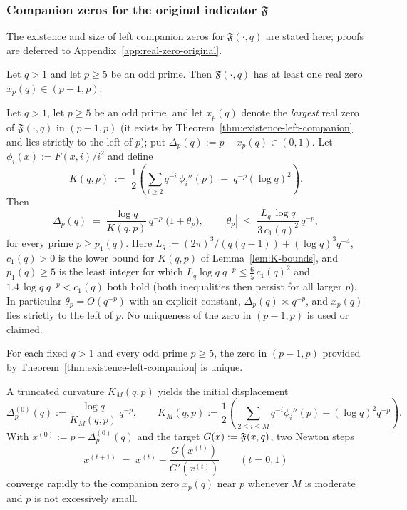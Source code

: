 \subsubsection{Companion zeros for the original indicator $\mathfrak F$}\label{sec:companions-F}
The existence and size of left companion zeros for $\mathfrak F(\cdot,q)$ are stated here; proofs are deferred to Appendix~\ref{app:real-zero-original}.

\begin{theorem}\label{thm:existence-left-companion}
Let $q>1$ and let $p\ge5$ be an odd prime. Then $\mathfrak F(\cdot,q)$ has at least one real zero $x_p(q)\in(p-1,p)$.
\end{theorem}

\begin{proposition}\label{prop:disp-asymp}
Let $q>1$, let $p\ge5$ be an odd prime, and let $x_p(q)$ denote the \emph{largest} real zero of $\mathfrak F(\cdot,q)$ in $(p-1,p)$ (it exists by Theorem~\ref{thm:existence-left-companion} and lies strictly to the left of $p$); put $\Delta_p(q):=p-x_p(q)\in(0,1)$. Let $\phi_i(x):=F(x,i)/i^2$ and define
\[
K(q,p)\;:=\;\frac{1}{2}\left(\sum_{i\ge2} q^{-i}\,\phi_i''(p)\;-\;q^{-p}(\log q)^2\right).
\]
Then
\[
\Delta_p(q)\;=\;\frac{\log q}{K(q,p)}\,q^{-p}\;\bigl(1+\theta_p\bigr),
\qquad
|\theta_p|\;\le\;\frac{L_q\,\log q}{3\,c_1(q)^2}\,q^{-p},
\]
for every prime $p\ge p_1(q)$. Here $L_q:=(2\pi)^3/(q(q-1))+(\log q)^3q^{-4}$, $c_1(q)>0$ is the lower bound for $K(q,p)$ of Lemma~\ref{lem:K-bounds}, and $p_1(q)\ge5$ is the least integer for which $L_q\log q\;q^{-p}\le\tfrac65\,c_1(q)^2$ and $1.4\,\log q\;q^{-p}<c_1(q)$ both hold (both inequalities then persist for all larger $p$). In particular $\theta_p=O(q^{-p})$ with an explicit constant, $\Delta_p(q)\asymp q^{-p}$, and $x_p(q)$ lies strictly to the left of $p$. No uniqueness of the zero in $(p-1,p)$ is used or claimed.
\end{proposition}

\begin{conjecture}[Uniqueness in $(p-1,p)$]\label{conj:uniqueness-companion}
For each fixed $q>1$ and every odd prime $p\ge5$, the zero in $(p-1,p)$ provided by Theorem~\ref{thm:existence-left-companion} is unique.
\end{conjecture}

\begin{remark}\label{rem:newton}
A truncated curvature $K_M(q,p)$ yields the initial displacement
\[
\Delta_p^{(0)}(q):=\frac{\log q}{K_M(q,p)}\,q^{-p},\qquad
K_M(q,p):=\frac{1}{2}\!\left(\sum_{2\le i\le M}\! q^{-i}\phi_i''(p)-(\log q)^2 q^{-p}\right).
\]
With $x^{(0)}:=p-\Delta_p^{(0)}(q)$ and the target $G(x):=\mathfrak F(x,q)$, two Newton steps
\[
x^{(t+1)}\;=\;x^{(t)}-\frac{G(x^{(t)})}{G'(x^{(t)})}\qquad(t=0,1)
\]
converge rapidly to the companion zero $x_p(q)$ near $p$ whenever $M$ is moderate and $p$ is not excessively small.
\end{remark}

